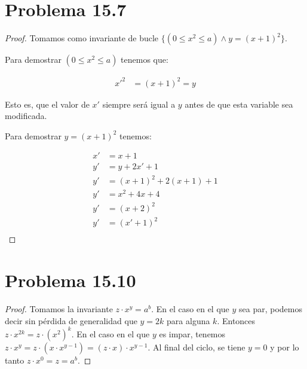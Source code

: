 \documentclass[letterpaper,12pt]{memoir}
\theoremstyle{definition}
\begin{document}
\section*{Problema 15.7}
\begin{proof}
	Tomamos como invariante de bucle \(\{(0 \leq x^2 \leq a) \land y = (x+1)^2\}\).
	
	Para demostrar \((0 \leq x^2 \leq a)\) tenemos que:
	
	\begin{align*}
	x'^2 &= (x+1)^2 = y 
	\end{align*}
	
	Esto es, que el valor de \(x'\) siempre será igual a \(y\) antes de que esta variable sea modificada.
	
	Para demostrar \(y = (x+1)^2\) tenemos:
	
	\begin{align*}
	x' &= x + 1\\
	y' &= y + 2x' + 1\\
	y' &= (x+1)^2 + 2(x+1) + 1\\
	y' &= x^2 + 4x + 4\\
	y' &= (x+2)^2\\
	y' &= (x'+1)^2\\
	\end{align*}
\end{proof}




\section*{Problema 15.10}

\begin{proof}
	Tomamos la invariante \(z \cdot x^y = a^b\). En el caso en el que \(y\) sea par, podemos decir sin pérdida de generalidad que \(y = 2k\) para alguna \(k\). Entonces \(z\cdot x^{2k} = z \cdot (x^2)^k \). En el caso en el que \(y\) es impar, tenemos \(z \cdot x^y = z \cdot (x \cdot x^{y-1}) = (z \cdot x) \cdot x^{y-1} \). Al final del ciclo, se tiene \(y = 0\) y por lo tanto \(z \cdot x^0 = z = a^b\).
	
\end{proof}


 
\end{document}
